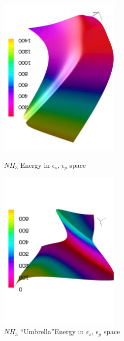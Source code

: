 %
\begin{figure}
\begin{minipage}[!htb]{7.6cm}
\begin{center}
\includegraphics[width=5.9cm,angle=-90]{figures/obj}
\caption{$NH_3$ Energy in $\epsilon_s$, $\epsilon_p$ space}
\label{spacenh3}
\end{center}
\end{minipage}
%
\begin{minipage}[!htb]{7.6cm}
\begin{center}
\includegraphics[width=5.9cm,angle=-90]{figures/umbobj}
\caption{$NH_3$ ``Umbrella''Energy in $\epsilon_s$, $\epsilon_p$ space}
\label{umbnh3}
\end{center}
\end{minipage}
\end{figure}
%
%
%

